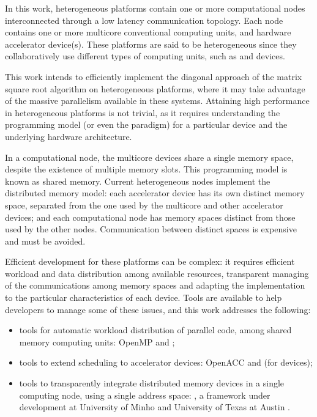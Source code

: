 
In this work, heterogeneous platforms contain one or more computational nodes interconnected through a low latency communication topology. Each node contains one or more multicore conventional computing units, and hardware accelerator device(s). These platforms are said to be heterogeneous since they collaboratively use different types of computing units, such as \gpus and \intel\mic devices.

This work intends to efficiently implement the diagonal approach of the matrix square root algorithm on heterogeneous platforms, where it may take advantage of the massive parallelism available in these systems. Attaining high performance in heterogeneous platforms is not trivial, as it requires understanding the programming model (or even the paradigm) for a particular device and the underlying hardware architecture.

In a computational node, the multicore \cpu devices share a single memory space, despite the existence of multiple memory slots.
This programming model is known as shared memory.
Current heterogeneous nodes implement the distributed memory model: each accelerator device has its own distinct memory space, separated from the one used by the multicore and other accelerator devices; and each computational node has memory spaces distinct from those used by the other nodes. Communication between distinct spaces is expensive and must be avoided.

Efficient development for these platforms can be complex: it requires efficient workload and data distribution among available resources, transparent managing of the communications among memory spaces and adapting the implementation to the particular characteristics of each device. Tools are available to help developers to manage some of these issues, and this work addresses the following:
\begin{itemize}
	\item tools for automatic workload distribution of parallel code, among shared memory computing units: OpenMP and \tbb\cite{TBB};
	\item tools to extend scheduling to accelerator devices: \mbox{OpenACC\cite{OpenACC}} and \tbb (for \intel devices)\cite{MIC:TBB};
	\item tools to transparently integrate distributed memory devices in a single computing node, using a single address space: \gama, a framework under development at University of Minho and University of Texas at Austin \cite{Mariano:Alves:2012}.
\end{itemize}
